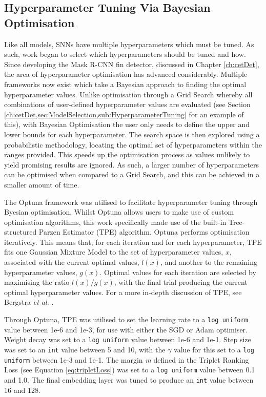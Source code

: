\subsection{Hyperparameter Tuning Via Bayesian Optimisation }\label{ch:ID,sec:SNNDevelopment,sub:Optuna}

Like all models, SNNs have multiple hyperparameters which must be tuned. As such, work began to select which hyperparameters should be tuned and how. Since developing the Mask R-CNN fin detector, discussed in Chapter \ref{ch:cetDet}, the area of hyperparameter optimisation has advanced considerably. Multiple frameworks now exist which take a Bayesian approach to finding the optimal hyperparameter values. Unlike optimisation through a Grid Search whereby all combinations of user-defined hyperparameter values are evaluated (see Section \ref{ch:cetDet,sec:ModelSelection,sub:HyperparameterTuning} for an example of this), with Bayesian Optimisation the user only needs to define the upper and lower bounds for each hyperparameter. The search space is then explored using a probabilistic methodology, locating the optimal set of hyperparameters within the ranges provided. This speeds up the optimisation process as values unlikely to yield promising results are ignored. As such, a larger number of hyperparameters can be optimised when compared to a Grid Search, and this can be achieved in a smaller amount of time. 

The Optuna framework \cite{akiba_optuna_2019}  was utilised to facilitate hyperparameter tuning through Byesian optimisation. Whilst Optuna allows users to make use of custom optimisation algorithms, this work specifically made use of the built-in Tree-structured Parzen Estimator (TPE) algorithm. Optuna performs optimisation iteratively. This means that, for each iteration and for each hyperparameter, TPE fits one Gaussian Mixture Model to the set of hyperparameter values, $x$, associated with the current optimal values, $l(x)$, and another to the remaining hyperparameter values, $g(x)$. Optimal values for each iteration are selected by maximising the ratio $l(x)/g(x)$, with the final trial producing the current optimal hyperparameter values. For a more in-depth discussion of TPE, see Bergstra \textit{et al.} \cite{bergstra_algorithms_2011}.

Through Optuna, TPE was utilised to set the learning rate to a \texttt{log uniform} value between 1e-6 and 1e-3, for use with either the SGD or Adam optimiser.  Weight decay was set to a \texttt{log uniform} value between 1e-6 and 1e-1. Step size was set to an \texttt{int} value between 5 and 10, with the $\gamma$ value for this set to a \texttt{log uniform} between 1e-3 and 1e-1. The margin \textit{m} defined in the Triplet Ranking Loss (see Equation \ref{eq:tripletLoss}) was set to a \texttt{log uniform} value between 0.1 and 1.0. The final embedding layer was tuned to produce an \texttt{int} value between 16 and 128.

